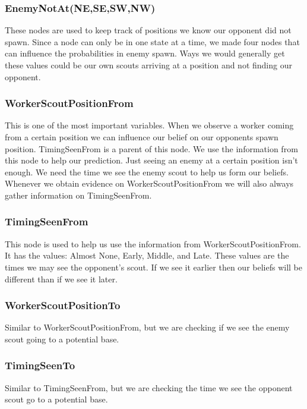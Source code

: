 \subsubsection*{EnemyNotAt(NE,SE,SW,NW)}
These nodes are used to keep track of positions we know our opponent did not spawn. Since a node can only be in one state at a time, we made four nodes that can influence the probabilities in enemy spawn. Ways we would generally get these values could be our own scouts arriving at a position and not finding our opponent.

\subsubsection*{WorkerScoutPositionFrom} This is one of the most important variables. When we observe a worker coming from a certain position we can influence our belief on our opponents spawn position. TimingSeenFrom is a parent of this node. We use the information from this node to help our prediction. Just seeing an enemy at a certain position isn't enough. We need the time we see the enemy scout to help us form our beliefs. Whenever we obtain evidence on WorkerScoutPositionFrom we will also always gather information on TimingSeenFrom.

\subsubsection*{TimingSeenFrom} This node is used to help us use the information from WorkerScoutPositionFrom. It has the values: Almost None, Early, Middle, and Late. These values are the times we may see the opponent's scout. If we see it earlier then our beliefs will be different than if we see it later.

\subsubsection*{WorkerScoutPositionTo} Similar to WorkerScoutPositionFrom, but we are checking if we see the enemy scout going to a potential base.

\subsubsection*{TimingSeenTo} Similar to TimingSeenFrom, but we are checking the time we see the opponent scout go to a potential base.


